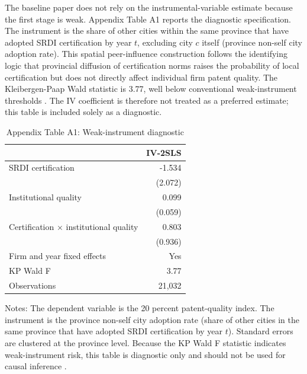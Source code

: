 \documentclass[12pt]{article}
\begin{document}
The baseline paper does not rely on the instrumental-variable estimate because the first stage is weak. Appendix Table A1 reports the diagnostic specification. The instrument is the share of other cities within the same province that have adopted SRDI certification by year \(t\), excluding city \(c\) itself (province non-self city adoption rate). This spatial peer-influence construction follows the identifying logic that provincial diffusion of certification norms raises the probability of local certification but does not directly affect individual firm patent quality. The Kleibergen-Paap Wald statistic is 3.77, well below conventional weak-instrument thresholds \citep{andrews2019}. The IV coefficient is therefore not treated as a preferred estimate; this table is included solely as a diagnostic.

\begin{table}[htbp]
\centering
\caption{Appendix Table A1: Weak-instrument diagnostic}
\begin{tabular}{lr}
\toprule
 & IV-2SLS \\
\midrule
SRDI certification & -1.534 \\
 & (2.072) \\
Institutional quality & 0.099 \\
 & (0.059) \\
Certification \(\times\) institutional quality & 0.803 \\
 & (0.936) \\
Firm and year fixed effects & Yes \\
KP Wald F & 3.77 \\
Observations & 21,032 \\
\bottomrule
\end{tabular}
\begin{minipage}{0.88\textwidth}
\footnotesize Notes: The dependent variable is the 20 percent patent-quality index. The instrument is the province non-self city adoption rate (share of other cities in the same province that have adopted SRDI certification by year \(t\)). Standard errors are clustered at the province level. Because the KP Wald F statistic indicates weak-instrument risk, this table is diagnostic only and should not be used for causal inference \citep{andrews2019}.
\end{minipage}
\end{table}
\end{document}
